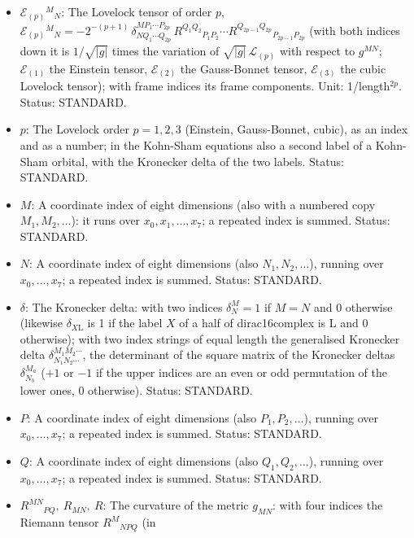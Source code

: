 \documentclass[
  10pt,
]{article}
\providecommand{\tightlist}{%
  \setlength{\itemsep}{0pt}\setlength{\parskip}{0pt}}
\begin{document}
\begin{itemize}
\tightlist
\item
  \(\mathcal{E}_{(p)}{}^M{}_N\): The Lovelock tensor of order \(p\),
  \(\mathcal{E}_{(p)}{}^M{}_N = -2^{-(p+1)}\,\delta^{MP_1\cdots P_{2p}}_{NQ_1\cdots Q_{2p}}\,R^{Q_1Q_2}{}_{P_1P_2}\cdots R^{Q_{2p-1}Q_{2p}}{}_{P_{2p-1}P_{2p}}\)
  (with both indices down it is \(1/\sqrt{\lvert g\rvert}\) times the
  variation of \(\sqrt{\lvert g\rvert}\,\mathcal{L}_{(p)}\) with respect
  to \(g^{MN}\); \(\mathcal{E}_{(1)}\) the Einstein tensor,
  \(\mathcal{E}_{(2)}\) the Gauss-Bonnet tensor, \(\mathcal{E}_{(3)}\)
  the cubic Lovelock tensor); with frame indices its frame components.
  Unit: 1/length\(^{2p}\). Status: STANDARD.
\item
  \(p\): The Lovelock order \(p = 1, 2, 3\) (Einstein, Gauss-Bonnet,
  cubic), as an index and as a number; in the Kohn-Sham equations also a
  second label of a Kohn-Sham orbital, with the Kronecker delta of the
  two labels. Status: STANDARD.
\item
  \(M\): A coordinate index of eight dimensions (also with a numbered
  copy \(M_1, M_2, \dots\)): it runs over \(x_0, x_1, \dots, x_7\); a
  repeated index is summed. Status: STANDARD.
\item
  \(N\): A coordinate index of eight dimensions (also
  \(N_1, N_2, \dots\)), running over \(x_0, \dots, x_7\); a repeated
  index is summed. Status: STANDARD.
\item
  \(\delta\): The Kronecker delta: with two indices \(\delta^M_N = 1\)
  if \(M = N\) and 0 otherwise (likewise \(\delta_{X\mathrm{L}}\) is 1
  if the label \(X\) of a half of dirac16complex is L and 0 otherwise);
  with two index strings of equal length the generalised Kronecker delta
  \(\delta^{M_1M_2\cdots}_{N_1N_2\cdots}\), the determinant of the
  square matrix of the Kronecker deltas \(\delta^{M_a}_{N_b}\) (\(+1\)
  or \(-1\) if the upper indices are an even or odd permutation of the
  lower ones, 0 otherwise). Status: STANDARD.
\item
  \(P\): A coordinate index of eight dimensions (also
  \(P_1, P_2, \dots\)), running over \(x_0, \dots, x_7\); a repeated
  index is summed. Status: STANDARD.
\item
  \(Q\): A coordinate index of eight dimensions (also
  \(Q_1, Q_2, \dots\)), running over \(x_0, \dots, x_7\); a repeated
  index is summed. Status: STANDARD.
\item
  \(R^{MN}{}_{PQ},\ R_{MN},\ R\): The curvature of the metric
  \(g_{MN}\): with four indices the Riemann tensor \(R^M{}_{NPQ}\) (in

\end{itemize}
\end{document}
